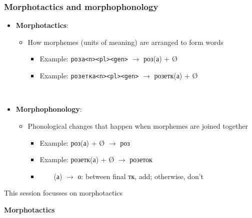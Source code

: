 \documentclass[10pt,xetex]{beamer} %
\begin{document}
\begin{frame}
  \frametitle{Morphotactics and morphophonology}

\begin{itemize}
  \item {\bf Morphotactics}:
  \begin{itemize}
    \item How morphemes (units of meaning) are arranged to form words
      \begin{itemize}
        \item Example: {\tt роза<n><pl><gen>} $\rightarrow$ роз(а) + Ø
       \item Example: {\tt розетка<n><pl><gen>} $\rightarrow$ розетк(а) + Ø
      \end{itemize}
  \end{itemize}
  ~\\
  \item {\bf Morphophonology}:
  \begin{itemize}
    \item Phonological changes that happen when morphemes are joined together
    \begin{itemize}
      \item Example: роз(а) + Ø $\rightarrow$ роз
      \item Example: розетк(а) + Ø $\rightarrow$ розеток
      \item ~~~~(а) $\rightarrow$ о: between final тк, add; otherwise, don't
    \end{itemize}
  \end{itemize}
\end{itemize}

This session focusses on morphotactics

\end{frame}


\begin{frame} %
 \begin{center}
 {\Large {\bf Morphotactics}}
 \end{center}
\end{frame}
\end{document}
